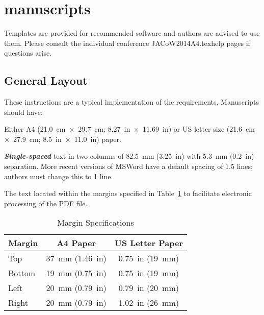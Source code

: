 \documentclass[a4paper,
              ]{jacow}
\begin{document}
\section{manuscripts}
Templates are provided for recommended software and authors are
advised to use them. Please consult the individual conference JACoW2014A4.texhelp pages if questions
arise.

\subsection{General Layout}

These instructions are a typical implementation of the
requirements. Manuscripts should have:
\begin{Itemize}
    \item  Either A4 (\SI{21.0}{cm}~$\times$~\SI{29.7}{cm}; \SI{8.27}{in}~$\times$~\SI{11.69}{in}) or US
           letter size (\SI{21.6}{cm}~$\times$~\SI{27.9}{cm}; \SI{8.5}{in}~$\times$~\SI{11.0}{in}) paper.
    \item  \textit{\textbf{Single-spaced}} text in two columns of \SI{82.5}{mm} (\SI{3.25}{in}) with \SI{5.3}{mm}
           (\SI{0.2}{in}) separation. More recent versions of MSWord have a default spacing of 1.5 lines;
           authors must change this to 1 line.
    \item  The text located within the margins specified in Table~\ref{l2ea4-t1}
           to facilitate electronic processing of the PDF file.
\end{Itemize}
\begin{table}[hbt]
   \centering
   \caption{Margin Specifications}
   \begin{tabular}{lcc}
       \toprule
       \textbf{Margin} & \textbf{A4 Paper}                      & \textbf{US Letter Paper} \\
       \midrule
           Top         & \SI{37}{mm} (\SI{1.46}{in})            & \SI{0.75}{in} (\SI{19}{mm})        \\
          Bottom       & \SI{19}{mm} (\SI{0.75}{in})            & \SI{0.75}{in} (\SI{19}{mm})        \\
           Left        & \SI{20}{mm} (\SI{0.79}{in})            & \SI{0.79}{in} (\SI{20}{mm})        \\
           Right       & \SI{20}{mm} (\SI{0.79}{in})            & \SI{1.02}{in} (\SI{26}{mm})        \\
       \bottomrule
   \end{tabular}
   \label{l2ea4-t1}
\end{table}
\end{document}
